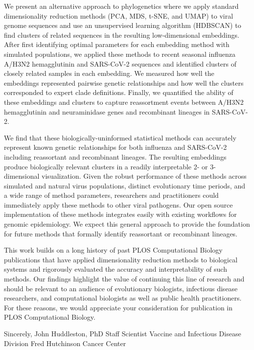 \documentclass[11pt]{article}
\begin{document}
We present an alternative approach to phylogenetics where we apply standard dimensionality reduction methods (PCA, MDS, t-SNE, and UMAP) to viral genome sequences and use an unsupervised learning algorithm (HDBSCAN) to find clusters of related sequences in the resulting low-dimensional embeddings.
After first identifying optimal parameters for each embedding method with simulated populations, we applied these methods to recent seasonal influenza A/H3N2 hemagglutinin and SARS-CoV-2 sequences and identified clusters of closely related samples in each embedding.
We measured how well the embeddings represented pairwise genetic relationships and how well the clusters corresponded to expert clade definitions.
Finally, we quantified the ability of these embeddings and clusters to capture reassortment events between A/H3N2 hemagglutinin and neuraminidase genes and recombinant lineages in SARS-CoV-2.

We find that these biologically-uninformed statistical methods can accurately represent known genetic relationships for both influenza and SARS-CoV-2 including reassortant and recombinant lineages.
The resulting embeddings produce biologically relevant clusters in a readily interpretable 2- or 3-dimensional visualization.
Given the robust performance of these methods across simulated and natural virus populations, distinct evolutionary time periods, and a wide range of method parameters, researchers and practitioners could immediately apply these methods to other viral pathogens.
Our open source implementation of these methods integrates easily with existing workflows for genomic epidemiology.
We expect this general approach to provide the foundation for future methods that formally identify reassortant or recombinant lineages.

This work builds on a long history of past PLOS Computational Biology publications that have applied dimensionality reduction methods to biological systems and rigorously evaluated the accuracy and interpretability of such methods.
Our findings highlight the value of continuing this line of research and should be relevant to an audience of evolutionary biologists, infectious disease researchers, and computational biologists as well as public health practitioners.
For these reasons, we would appreciate your consideration for publication in PLOS Computational Biology.

\vspace{0.3in} %

Sincerely, \newline
\vspace{0.05in} \newline
John Huddleston, PhD \newline
Staff Scientist \newline
Vaccine and Infectious Disease Division \newline
Fred Hutchinson Cancer Center
\end{document}
